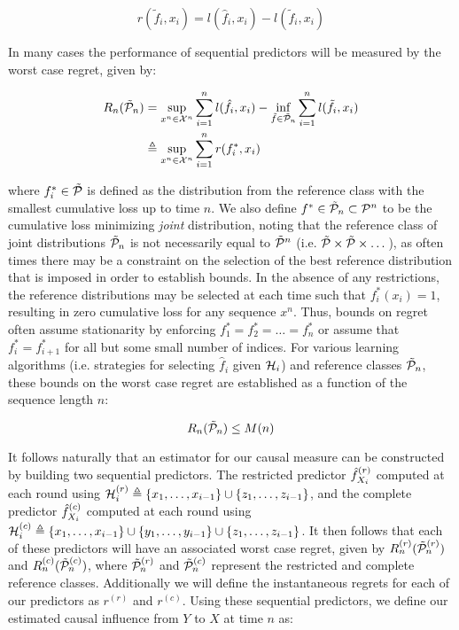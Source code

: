 \begin{equation}
r(\tilde{f}_i,x_i) = l(\hat{f}_i,x_i) - l(\tilde{f}_i,x_i)
\end{equation}

\noindent In many cases the performance of sequential predictors will be measured by the worst case regret, given by:

\begin{align}
R_n(\refclass_n) &= \sup_{x^n \in \mc{X}^n} \sum_{i=1}^n l(\hat{f}_i,x_i) - \inf_{\tilde{f}\in \refclass_n} \sum_{i=1}^n l(\tilde{f}_i,x_i) \label{optimal_f} \\
&\triangleq \sup_{x^n \in \mc{X}^n} \sum_{i=1}^n r(f^*_i,x_i)
\end{align}

\noindent where $f^*_i \in \tilde{\mathcal{P}}$ is defined as the distribution from the reference class with the smallest cumulative loss up to time $n$. We also define $f^* \in \tilde{\mathcal{P}}_n \subset \mathcal{P}^n$ to be the cumulative loss minimizing \emph{joint} distribution, noting that the reference class of joint distributions $\tilde{\mathcal{P}}_n$ is not necessarily equal to $\tilde{\mathcal{P}}^n$ (i.e. $\tilde{\mathcal{P}} \times \tilde{\mathcal{P}} \times \dots$), as often times there may be a constraint on the selection of the best reference distribution that is imposed in order to establish bounds. In the absence of any restrictions, the reference distributions may be selected at each time such that $f^*_i(x_i)=1$, resulting in zero cumulative loss for any sequence $x^n$. Thus, bounds on regret often assume stationarity by enforcing $f_1^*=f_2^*=\dots=f_n^*$ or assume that $f_i^* = f^*_{i+1}$ for all but some small number of indices. For various learning algorithms (i.e. strategies for selecting $\hat{f}_i$ given $\mathcal{H}_i$) and reference classes $\tilde{\mathcal{P}}_n$, these bounds on the worst case regret are established as a function of the sequence length $n$:

\begin{equation}
R_n(\tilde{\mathcal{P}}_n) \le M(n)
\end{equation}

It follows naturally that an estimator for our causal measure can be constructed by building two sequential predictors. The restricted predictor $\hat{f}_{X_i}^{(r)}$ computed at each round using $\mathcal{H}_i^{(r)} \triangleq \{x_1,\dots,x_{i-1}\} \cup \{z_1,\dots,z_{i-1}\}$, and the complete predictor $\hat{f}_{X_i}^{(c)}$ computed at each round using $\mathcal{H}_i^{(c)} \triangleq \{x_1,\dots,x_{i-1}\} \cup \{y_1,\dots,y_{i-1}\} \cup \{z_1,\dots,z_{i-1}\}$. It then follows that each of these predictors will have an associated worst case regret, given by $R^{(r)}_n(\tilde{\mathcal{P}}^{(r)}_n)$ and $R^{(c)}_n(\tilde{\mathcal{P}}^{(c)}_n)$, where $\tilde{\mathcal{P}}^{(r)}_n$ and $\tilde{\mathcal{P}}^{(c)}_n$ represent the restricted and complete reference classes. Additionally we will define the instantaneous regrets for each of our predictors as $r^{(r)}$ and $r^{(c)}$. Using these sequential predictors, we define our estimated causal influence from $Y$ to $X$ at time $n$ as:

